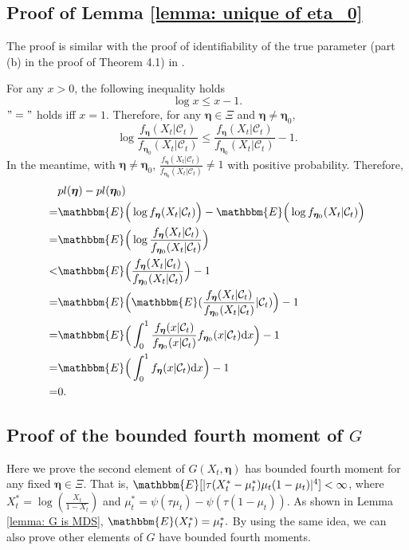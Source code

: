 \documentclass{article}
\theoremstyle{definition}
\begin{document}
\subsection{Proof of Lemma \ref{lemma: unique of eta_0}}
\label{app: unique of eta_0}
The proof is similar with the proof of identifiability of the true parameter (part (b) in the proof of Theorem 4.1) in \cite{gorgi2019bnb}. 

For any $x>0$, the following inequality holds
\begin{equation*}
    \log x \leq x-1.
\end{equation*}
$"="$ holds iff $x=1.$
Therefore, for any $\bm{\eta} \in \Xi$ and $\bm{\eta} \neq \bm{\eta}_0$, 
\begin{equation}
    \log \frac{f_{\bm{\eta}}(X_t|\mathcal{C}_t)}{f_{\bm{\eta}_0}(X_t|\mathcal{C}_t)} \leq \frac{f_{\bm{\eta}}(X_t|\mathcal{C}_t)}{f_{\bm{\eta}_0}(X_t|\mathcal{C}_t)}-1.
\end{equation}
In the meantime, with $\bm{\eta} \neq \bm{\eta}_0$, $\frac{f_{\bm{\eta}}(X_t|\mathcal{C}_t)}{f_{\bm{\eta}_0}(X_t|\mathcal{C}_t)} \neq 1$ with positive probability. Therefore, 
\begin{equation*}
    \begin{aligned}
    &pl(\bm{\eta})-pl(\bm{\eta}_0)  \\
    =&\mathbbm{E}\Big(\log f_{\bm{\eta}}(X_t|\mathcal{C}_t)\Big)-\mathbbm{E}\Big(\log f_{\bm{\eta}_0}(X_t|\mathcal{C}_t)\Big) \\
    =& \mathbbm{E}\Big(\log \frac{f_{\bm{\eta}}(X_t|\mathcal{C}_t)}{f_{\bm{\eta}_0}(X_t|\mathcal{C}_t)}\Big) \\
    <& \mathbbm{E}\Big(\frac{f_{\bm{\eta}}(X_t|\mathcal{C}_t)}{f_{\bm{\eta}_0}(X_t|\mathcal{C}_t)}\Big)-1 \\
    =& \mathbbm{E}\Big(\mathbbm{E}(\frac{f_{\bm{\eta}}(X_t|\mathcal{C}_t)}{f_{\bm{\eta}_0}(X_t|\mathcal{C}_t)}|\mathcal{C}_t)\Big)-1 \\
    =& \mathbbm{E}\Big(\int_0^1 \frac{f_{\bm{\eta}}(x|\mathcal{C}_t)}{f_{\bm{\eta}_0}(x|\mathcal{C}_t)}f_{\bm{\eta}_0}(x|\mathcal{C}_t) \text{d}x\Big)-1 \\
    =& \mathbbm{E}\Big(\int_0^1 f_{\bm{\eta}}(x|\mathcal{C}_t)\text{d}x \Big)-1\\
    =&0.
    \end{aligned}
\end{equation*}
\subsection{Proof of the bounded fourth moment of $G$}
Here we prove the second element of $G(X_t, \bm{\eta})$ has bounded fourth moment for any fixed $\bm{\eta} \in \Xi$. That is, $\mathbbm{E}[|\tau(X_t^*-\mu_t^*)\mu_t(1-\mu_t)|^4]<\infty$, where $X^*_t = \log(\frac{X_t}{1-X_t})$ and $\mu_t^* = \psi(\tau \mu_t)-\psi(\tau(1-\mu_t))$. As shown in Lemma \ref{lemma: G is MDS}, $\mathbbm{E}(X^*_t) = \mu^*_t.$ By using the same idea, we can also prove other elements of $G$ have bounded fourth moments. 
\end{document}
